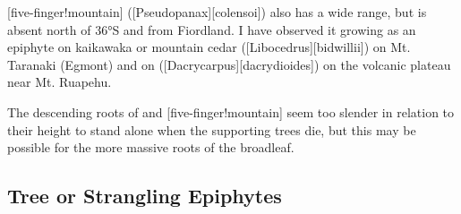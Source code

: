 [five-finger!mountain] ([Pseudopanax][colensoi]) also has a wide range, but is absent north of \ang{36}S and from Fiordland.
I have observed it growing as an epiphyte on kaikawaka or mountain cedar ([Libocedrus][bidwillii]) on Mt.
Taranaki (Egmont) and on  ([Dacrycarpus][dacrydioides]) on the volcanic plateau near Mt.
Ruapehu.

The descending roots of  and [five-finger!mountain] seem too slender in relation to their height to stand alone when the supporting trees die, but this may be possible for the more massive roots of the broadleaf.

\subsection{Tree or Strangling Epiphytes}

